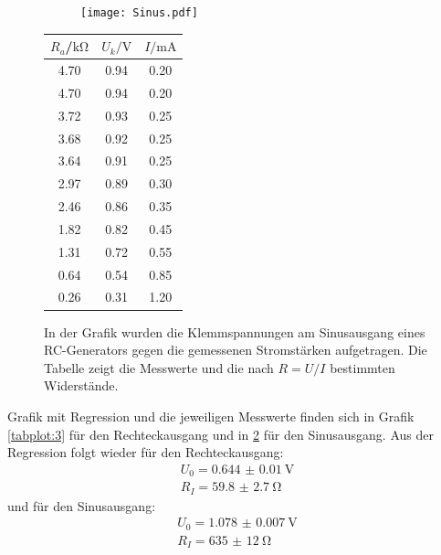 \begin{figure}[h]
  \begin{subfigure}{0.74\textwidth}
  \centering
    \texttt{[image: Sinus.pdf]}
    \label{sub:7}
    \qquad
  \end{subfigure}
  \begin{subtable}{0.25\textwidth}
  \centering
    \begin{tabular}{c c c}
    \toprule
    $R_a$/$\si{\kilo\ohm}$ & $U_{k}/\si{\volt}$ & $I/\si{\milli\ampere}$ \\
    \midrule
    4.70 & 0.94 & 0.20 \\
    4.70 & 0.94 & 0.20 \\
    3.72 & 0.93 & 0.25 \\
    3.68 & 0.92 & 0.25 \\
    3.64 & 0.91 & 0.25 \\
    2.97 & 0.89 & 0.30 \\
    2.46 & 0.86 & 0.35 \\
    1.82 & 0.82 & 0.45 \\
    1.31 & 0.72 & 0.55 \\
    0.64 & 0.54 & 0.85 \\
    0.26 & 0.31 & 1.20 \\
    \bottomrule
    \end{tabular}
    \label{sub:8}
    \qquad
  \end{subtable}
  \caption{In der Grafik wurden die Klemmspannungen am Sinusausgang eines RC-Generators
  gegen die gemessenen Stromstärken aufgetragen. Die Tabelle zeigt die Messwerte und die
   nach $R = U/I$ bestimmten Widerstände.}
  \label{tabplot:4}
\end{figure}
Grafik mit Regression und die jeweiligen Messwerte finden sich in Grafik \ref{tabplot:3} für den
Rechteckausgang und in \ref{tabplot:4} für den Sinusausgang. Aus der Regression folgt wieder für
den Rechteckausgang:
\begin{equation*}
  \begin{split}
    U_0 = \SI{0.644(10)}{\volt}\\
    R_I = \SI{59.8(27)}{\ohm}
  \end{split}
\end{equation*}
und für den Sinusausgang:
\begin{equation*}
  \begin{split}
    U_0 = \SI{1.078(7)}{\volt}\\
    R_I = \SI{635(12)}{\ohm}
  \end{split}
\end{equation*}
\newpage
